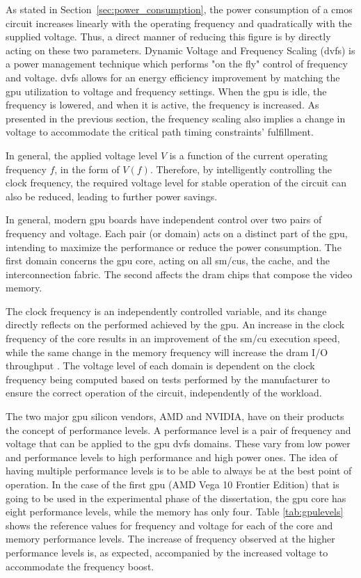 As stated in Section~\ref{sec:power_consumption}, the power consumption of a \acrshort{cmos} circuit increases linearly with the operating frequency and quadratically with the supplied voltage. Thus, a direct manner of reducing this figure is by directly acting on these two parameters. 
Dynamic Voltage and Frequency Scaling (\acrshort{dvfs}) is a power management technique which performs "on the fly" control of frequency and voltage. \acrshort{dvfs} allows for an energy efficiency improvement by matching the \acrshort{gpu} utilization to voltage and frequency settings. When the \acrshort{gpu} is idle, the frequency is lowered, and when it is active, the frequency is increased. As presented in the previous section, the frequency scaling also implies a change in voltage to accommodate the critical path timing constraints' fulfillment. 

In general, the applied voltage level $V$ is a function of the current operating frequency $f$, in the form of $V(f)$. Therefore, by intelligently controlling the clock frequency, the required voltage level for stable operation of the circuit can also be reduced, leading to further power savings.

In general, modern \acrshort{gpu} boards have independent control over two pairs of frequency and voltage. Each pair (or domain) acts on a distinct part of the \acrshort{gpu}, intending to maximize the performance or reduce the power consumption. The first domain concerns the \acrshort{gpu} core, acting on all \acrshort{sm}/\acrshort{cu}s, the cache, and the interconnection fabric. The second affects the \acrshort{dram} chips that compose the video memory. 

The clock frequency is an independently controlled variable, and its change directly reflects on the performed achieved by the \acrshort{gpu}. An increase in the clock frequency of the core results in an improvement of the \acrshort{sm}/\acrshort{cu} execution speed, while the same change in the memory frequency will increase the \acrshort{dram} I/O throughput \cite{mei_survey_2016}. The voltage level of each domain is dependent on the clock frequency being computed based on tests performed by the manufacturer to ensure the correct operation of the circuit, independently of the workload.

The two major \acrshort{gpu} silicon vendors, AMD and NVIDIA, have on their products the concept of performance levels. A performance level is a pair of frequency and voltage that can be applied to the \acrshort{gpu} \acrshort{dvfs} domains. These vary from low power and performance levels to high performance and high power ones. The idea of having multiple performance levels is to be able to always be at the best point of operation. In the case of the first \acrshort{gpu} (AMD Vega 10 Frontier Edition) that is going to be used in the experimental phase of the dissertation, the \acrshort{gpu} core has eight performance levels, while the memory has only four. Table \ref{tab:gpulevels} shows the reference values for frequency and voltage for each of the core and memory performance levels. 
The increase of frequency observed at the higher performance levels is, as expected, accompanied by the increased voltage to accommodate the frequency boost.


